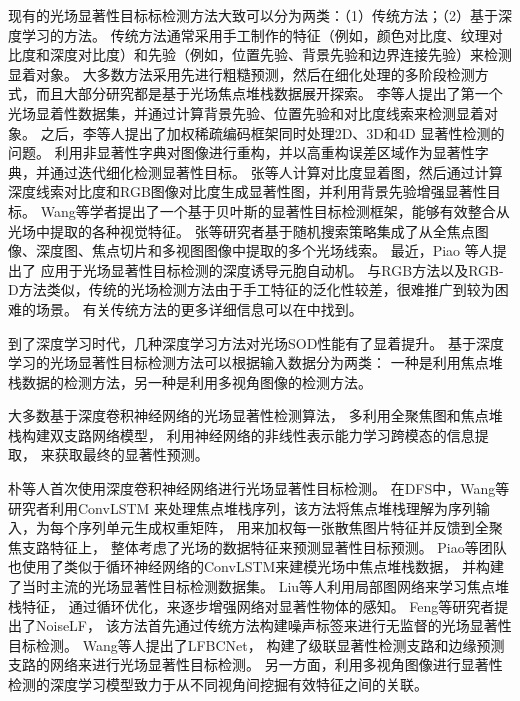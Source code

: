 现有的光场显著性目标标检测方法大致可以分为两类：（1）传统方法；（2）基于深度学习的方法。 传统方法通常采用手工制作的特征（例如，颜色对比度、纹理对比度和深度对比度）和先验（例如，位置先验、背景先验和边界连接先验）来检测显着对象。 
大多数方法采用先进行粗糙预测，然后在细化处理的多阶段检测方式，而且大部分研究都是基于光场焦点堆栈数据展开探索。
%
%
李等人提出了第一个光场显着性数据集，并通过计算背景先验、位置先验和对比度线索来检测显着对象。
之后，李等人提出了加权稀疏编码框架同时处理2D、3D和4D 显著性检测的问题。
利用非显著性字典对图像进行重构，并以高重构误差区域作为显著性字典，并通过迭代细化检测显著性目标。
张等人计算对比度显着图，然后通过计算深度线索对比度和RGB图像对比度生成显著性图，并利用背景先验增强显著性目标。
Wang等学者提出了一个基于贝叶斯的显著性目标检测框架，能够有效整合从光场中提取的各种视觉特征。
张等研究者基于随机搜索策略集成了从全焦点图像、深度图、焦点切片和多视图图像中提取的多个光场线索。 
最近，Piao 等人提出了
应用于光场显著性目标检测的深度诱导元胞自动机。
与RGB方法以及RGB-D方法类似，传统的光场检测方法由于手工特征的泛化性较差，很难推广到较为困难的场景。
有关传统方法的更多详细信息可以在中找到。





到了深度学习时代，几种深度学习方法对光场SOD性能有了显着提升。 
基于深度学习的光场显著性目标检测方法可以根据输入数据分为两类：
一种是利用焦点堆栈数据的检测方法，另一种是利用多视角图像的检测方法。



大多数基于深度卷积神经网络的光场显著性检测算法，
多利用全聚焦图和焦点堆栈构建双支路网络模型，
利用神经网络的非线性表示能力学习跨模态的信息提取，
来获取最终的显著性预测。


朴等人首次使用深度卷积神经网络进行光场显著性目标检测。
在DFS中，Wang等研究者利用ConvLSTM
来处理焦点堆栈序列，该方法将焦点堆栈理解为序列输入，为每个序列单元生成权重矩阵，
用来加权每一张散焦图片特征并反馈到全聚焦支路特征上，
整体考虑了光场的数据特征来预测显著性目标预测。
Piao等团队也使用了类似于循环神经网络的ConvLSTM来建模光场中焦点堆栈数据，
并构建了当时主流的光场显著性目标检测数据集。
Liu等人利用局部图网络来学习焦点堆栈特征，
通过循环优化，来逐步增强网络对显著性物体的感知。
Feng等研究者提出了NoiseLF，
该方法首先通过传统方法构建噪声标签来进行无监督的光场显著性目标检测。
Wang等人提出了LFBCNet，
构建了级联显著性检测支路和边缘预测支路的网络来进行光场显著性目标检测。
另一方面，利用多视角图像进行显著性检测的深度学习模型致力于从不同视角间挖掘有效特征之间的关联。



